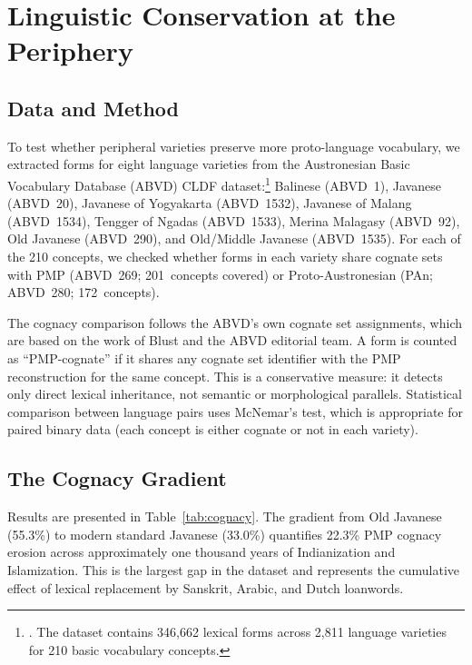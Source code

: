 \documentclass[12pt,a4paper]{article}
\begin{document}
\section{Linguistic Conservation at the Periphery}
\label{sec:linguistic}

\subsection{Data and Method}
\label{sec:cognacy}

To test whether peripheral varieties preserve more proto-language vocabulary, we extracted forms for eight language varieties from the Austronesian Basic Vocabulary Database (ABVD) CLDF dataset:\footnote{\autocite{greenhill2008abvd}. The dataset contains 346,662 lexical forms across 2,811 language varieties for 210 basic vocabulary concepts.} Balinese (ABVD~1), Javanese (ABVD~20), Javanese of Yogyakarta (ABVD~1532), Javanese of Malang (ABVD~1534), Tengger of Ngadas (ABVD~1533), Merina Malagasy (ABVD~92), Old Javanese (ABVD~290), and Old/Middle Javanese (ABVD~1535). For each of the 210 concepts, we checked whether forms in each variety share cognate sets with PMP (ABVD~269; 201~concepts covered) or Proto-Austronesian (PAn; ABVD~280; 172~concepts).

The cognacy comparison follows the ABVD's own cognate set assignments, which are based on the work of Blust and the ABVD editorial team. A form is counted as ``PMP-cognate'' if it shares any cognate set identifier with the PMP reconstruction for the same concept. This is a conservative measure: it detects only direct lexical inheritance, not semantic or morphological parallels. Statistical comparison between language pairs uses McNemar's test, which is appropriate for paired binary data (each concept is either cognate or not in each variety).

\subsection{The Cognacy Gradient}

Results are presented in Table~\ref{tab:cognacy}. The gradient from Old Javanese (55.3\%) to modern standard Javanese (33.0\%) quantifies 22.3\% PMP cognacy erosion across approximately one thousand years of Indianization and Islamization. This is the largest gap in the dataset and represents the cumulative effect of lexical replacement by Sanskrit, Arabic, and Dutch loanwords.
\end{document}
